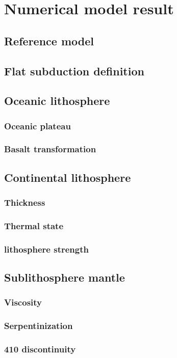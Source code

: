 
\chapter{Numerical model result}

\section{Reference model}

\section{Flat subduction definition}

\section{Oceanic lithosphere}
\subsection{Oceanic plateau}
\subsection{Basalt transformation}

\section{Continental lithosphere}
\subsection{Thickness}
\subsection{Thermal state}
\subsection{lithosphere strength}

\section{Sublithosphere mantle}
\subsection{Viscosity}
\subsection{Serpentinization}
\subsection{410 discontinuity}
